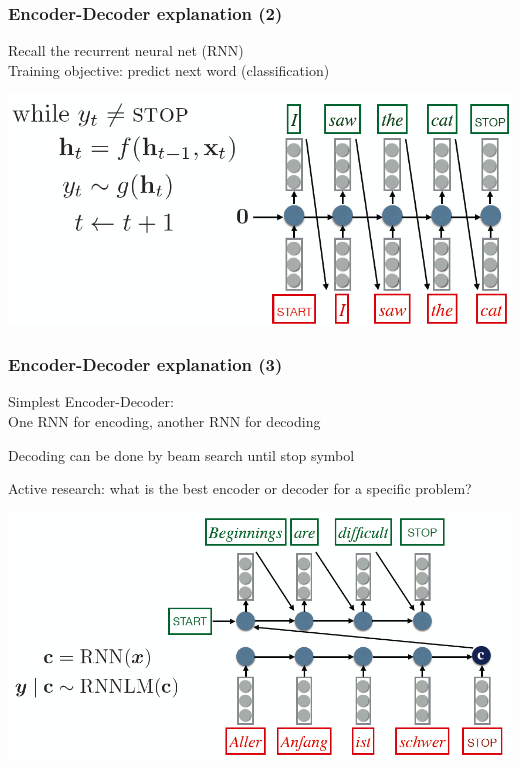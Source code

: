 \begin{frame}
\frametitle{Encoder-Decoder explanation (2)}
Recall the recurrent neural net (RNN)\\[0.2cm]
Training objective: predict next word (classification)
\centerline{\includegraphics[scale=0.35]{figs/explain_encdec2}}
\end{frame}

\begin{frame}
\frametitle{Encoder-Decoder explanation (3)}
Simplest Encoder-Decoder: \\[0.2cm]
One RNN for encoding, another RNN for decoding
\bi
\item Decoding can be done by beam search until stop symbol
\item Active research: what is the best encoder or decoder for a specific problem?
\ei
\centerline{\includegraphics[scale=0.32]{figs/explain_encdec3}}
\end{frame}

